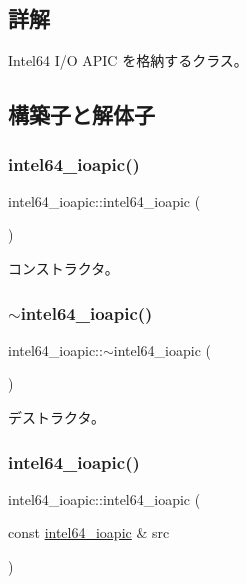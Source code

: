 \subsection{詳解}
Intel64 I/O A\+P\+IC を格納するクラス。 

\subsection{構築子と解体子}
\hypertarget{classintel64__ioapic_a3306f184d7c81a1e2a8762cb7aac9e6d}{}\label{classintel64__ioapic_a3306f184d7c81a1e2a8762cb7aac9e6d} 
\subsubsection{\texorpdfstring{intel64\+\_\+ioapic()}{intel64\_ioapic()}\hspace{0.1cm}{\footnotesize\ttfamily [1/3]}}
{\footnotesize\ttfamily intel64\+\_\+ioapic\+::intel64\+\_\+ioapic (\begin{DoxyParamCaption}{ }\end{DoxyParamCaption})}

コンストラクタ。 \hypertarget{classintel64__ioapic_a08463ca362fd28f4db43173fd08754df}{}\label{classintel64__ioapic_a08463ca362fd28f4db43173fd08754df} 
\subsubsection{\texorpdfstring{$\sim$intel64\+\_\+ioapic()}{~intel64\_ioapic()}}
{\footnotesize\ttfamily intel64\+\_\+ioapic\+::$\sim$intel64\+\_\+ioapic (\begin{DoxyParamCaption}{ }\end{DoxyParamCaption})\hspace{0.3cm}{\ttfamily [virtual]}}

デストラクタ。 \hypertarget{classintel64__ioapic_a2922ee7f84429f41538e711363c1d01b}{}\label{classintel64__ioapic_a2922ee7f84429f41538e711363c1d01b} 
\subsubsection{\texorpdfstring{intel64\+\_\+ioapic()}{intel64\_ioapic()}\hspace{0.1cm}{\footnotesize\ttfamily [2/3]}}
{\footnotesize\ttfamily intel64\+\_\+ioapic\+::intel64\+\_\+ioapic (\begin{DoxyParamCaption}\item[{const \hyperlink{classintel64__ioapic}{intel64\+\_\+ioapic} \&}]{src }\end{DoxyParamCaption})\hspace{0.3cm}{\ttfamily [delete]}}

